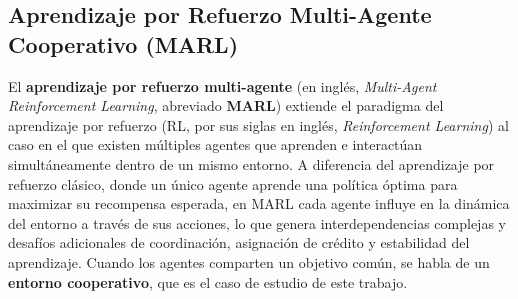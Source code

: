 


\subsection{Aprendizaje por Refuerzo Multi-Agente Cooperativo (MARL)}
\label{subsec:marl_cooperativo}

El \textbf{aprendizaje por refuerzo multi-agente} (en inglés, \emph{Multi-Agent Reinforcement Learning}, abreviado \textbf{MARL}) extiende el paradigma del aprendizaje por refuerzo (RL, por sus siglas en inglés, \emph{Reinforcement Learning}) al caso en el que existen múltiples agentes que aprenden e interactúan simultáneamente dentro de un mismo entorno.  
A diferencia del aprendizaje por refuerzo clásico, donde un único agente aprende una política óptima para maximizar su recompensa esperada, en MARL cada agente influye en la dinámica del entorno a través de sus acciones, lo que genera interdependencias complejas y desafíos adicionales de coordinación, asignación de crédito y estabilidad del aprendizaje.  
Cuando los agentes comparten un objetivo común, se habla de un \textbf{entorno cooperativo}, que es el caso de estudio de este trabajo. \cite{marlbook}

